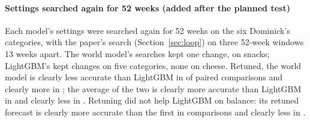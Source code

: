 \paragraph{Settings searched again for 52 weeks (added after the planned test)}
Each model's settings were searched again for 52 weeks on the six Dominick's
categories, with the paper's search (Section~\ref{sec:loop}) on three 52-week
windows 13 weeks apart. The world model's searches kept one change, on snacks;
LightGBM's kept changes on five categories,
none on cheese. Retuned, the world model is clearly less accurate than LightGBM
in \lhPTunedWmLgbWorse{} of \lhPTunedWmLgbN{} paired comparisons and clearly more
in \lhPTunedWmLgbBetter; the average of the two is clearly more accurate than
LightGBM in \lhPTunedAvgLgbBetter{} and clearly less in \lhPTunedAvgLgbWorse.
Retuning did not help LightGBM on balance: its retuned forecast is clearly more
accurate than the first in \lhPTunedLgbBetter{} comparisons and clearly less in
\lhPTunedLgbWorse.


